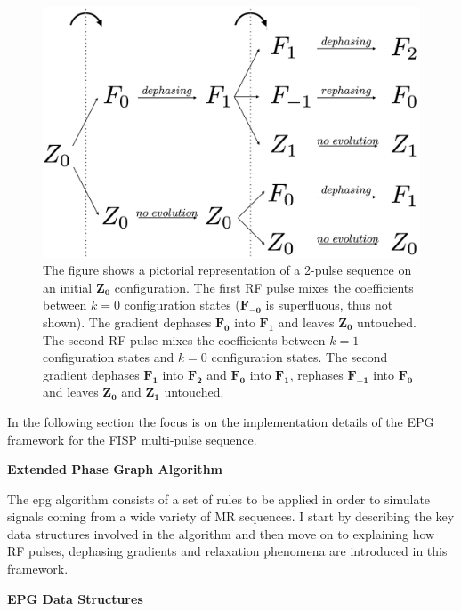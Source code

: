 \begin{figure}[ht]
    \centering
    \includegraphics[angle=0,width=1\textwidth, keepaspectratio]{images/mrf/multiblockfisp}
    \caption{The figure shows a pictorial representation of a 2-pulse sequence on an initial $\bm{Z_0}$ configuration.
    The first RF pulse mixes the coefficients between $k=0$ configuration states ($\bm{F_{-0}}$ is superfluous, thus not shown).
    The gradient dephases $\bm{F_{0}}$ into $\bm{F_{1}}$ and leaves $\bm{Z_{0}}$ untouched.
    The second RF pulse mixes the coefficients between $k=1$ configuration states and $k=0$ configuration states.
    The second gradient dephases $\bm{F_{1}}$ into $\bm{F_{2}}$ and $\bm{F_{0}}$ into $\bm{F_{1}}$, 
    rephases $\bm{F_{-1}}$ into $\bm{F_{0}}$ and leaves $\bm{Z_{0}}$ and $\bm{Z_{1}}$ untouched.
    }
    \label{fig:multiblockfisp}
\end{figure}

\hfill

In the following section the focus is on the implementation details of the EPG framework for the FISP multi-pulse sequence.

\hfill

\large \textbf{Extended Phase Graph Algorithm} \normalsize

The \ac{epg} algorithm consists of a set of rules to be applied in order to simulate signals coming from a wide variety of MR sequences.
I start by describing the key data structures involved in the algorithm and then move on to explaining how RF pulses, dephasing gradients and relaxation phenomena are introduced in this framework.

\hfill

\textbf{EPG Data Structures}

